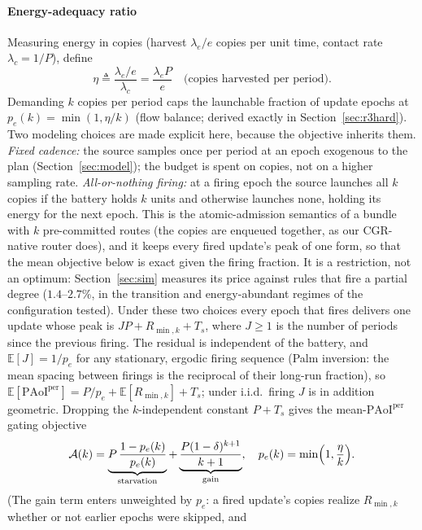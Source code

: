 \documentclass[twocolumn,3p,times,procedia]{elsarticle}
\theoremstyle{plain}
\theoremstyle{remark}
\newcommand{\PAoIper}{\mathrm{PAoI}^{\mathrm{per}}}
\newcommand{\E}{\mathbb{E}}
\newcommand{\peff}{p_e}
\begin{document}
\paragraph*{Energy-adequacy ratio}
Measuring energy in copies (harvest $\lambda_e/e$ copies per unit
time, contact rate $\lambda_c=1/P$), define
\begin{equation}
\eta\triangleq\frac{\lambda_e/e}{\lambda_c}=\frac{\lambda_e P}{e}
\quad\text{(copies harvested per period).}
\end{equation}
Demanding $k$ copies per period caps the launchable fraction of update
epochs at $\peff(k)=\min(1,\eta/k)$ (flow balance; derived exactly in
Section~\ref{sec:r3hard}). Two modeling choices are made explicit here,
because the objective inherits them. \emph{Fixed cadence:} the source
samples once per period at an epoch exogenous to the plan
(Section~\ref{sec:model}); the budget is spent on copies, not on a
higher sampling rate. \emph{All-or-nothing firing:} at a firing epoch
the source launches all $k$ copies if the battery holds $k$ units and
otherwise launches none, holding its energy for the next epoch. This is
the atomic-admission semantics of a bundle with $k$ pre-committed
routes (the copies are enqueued together, as our CGR-native router
does), and it keeps every fired update's peak of one form, so that the
mean objective below is exact given the firing fraction. It is a
restriction, not an optimum: Section~\ref{sec:sim} measures its price
against rules that fire a partial degree ($1.4$--$2.7\%$, in the
transition and energy-abundant regimes of the configuration tested).
Under these two choices every epoch that fires delivers one update
whose peak is $JP+R_{\min,k}+T_s$, where $J\ge1$ is the number of
periods since the previous firing. The residual is independent of the
battery, and $\E[J]=1/\peff$ for any stationary, ergodic firing
sequence (Palm inversion: the mean spacing between firings is the
reciprocal of their long-run fraction), so
$\E[\PAoIper]=P/\peff+\E[R_{\min,k}]+T_s$; under i.i.d.\ firing $J$ is
in addition geometric. Dropping the
$k$-independent constant $P+T_s$ gives the
mean-$\PAoIper$ gating objective
\begin{equation}\label{eq:obj}
\mathcal{A}(k)=
\underbrace{P\,\frac{1-\peff(k)}{\peff(k)}}_{\text{starvation}}
+\underbrace{\frac{P(1-\delta)^{k+1}}{k+1}}_{\text{gain}},
\quad\peff(k)=\min\Bigl(1,\frac{\eta}{k}\Bigr).
\end{equation}
(The gain term enters unweighted by $\peff$: a fired update's copies
realize $R_{\min,k}$ whether or not earlier epochs were skipped, and
\end{document}
